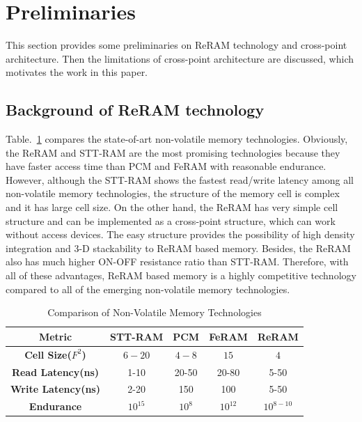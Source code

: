 \vspace{10pt}
\section{Preliminaries}\label{sec:preliminary}

This section provides some preliminaries on ReRAM technology and cross-point architecture. Then the limitations of cross-point architecture are discussed, which motivates the work in this paper.


\subsection{Background of ReRAM technology}
Table.~\ref{table:compare} compares the state-of-art non-volatile memory technologies. Obviously, the ReRAM and STT-RAM are the most promising technologies because they have faster access time than PCM and FeRAM with reasonable endurance. However, although the STT-RAM shows the fastest read/write latency among all non-volatile memory technologies, the structure of the memory cell is complex and it has large cell size. On the other hand, the ReRAM has very simple cell structure and can be implemented as a cross-point structure, which can work without access devices. The easy structure provides the possibility of high density integration and 3-D stackability to ReRAM based memory. Besides, the ReRAM also has much higher ON-OFF resistance ratio than STT-RAM. Therefore, with all of these advantages, ReRAM based memory is a highly competitive
technology compared to all of the emerging non-volatile memory technologies.

\begin{table}[!b]
  \centering
  \scriptsize
    \scriptsize
  \caption{Comparison of Non-Volatile Memory Technologies}\label{table:compare}
  \vspace{-5pt}
  \begin{tabular}{|c|cccc|}
    \hline
    \textbf{Metric} & \textbf{STT-RAM} & \textbf{PCM}    & \textbf{FeRAM} & \textbf{ReRAM}
    \\\hline
    \textbf{Cell Size($F^2$)} & $6-20$ & $4-8$ & $15$ & $4$\\\hline
    \textbf{Read Latency(ns)} &  1-10 & 20-50 & 20-80 & 5-50\\\hline
    \textbf{Write Latency(ns)} & 2-20& 150& 100& 5-50\\\hline
    \textbf{Endurance} &  $10^{15}$ & $10^8$ & $10^{12}$ & $10^{8-10}$\\\hline
  \end{tabular}
  \vspace{-10pt}
\end{table}


